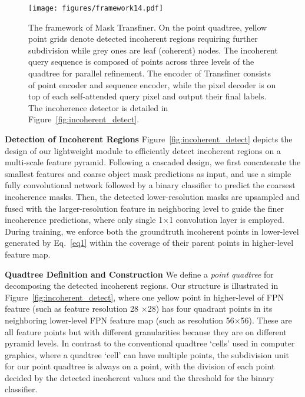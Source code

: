 \documentclass[10pt,twocolumn,letterpaper]{article}
\newcommand{\parsection}[1]{\vspace{1mm}\noindent\textbf{#1}}
\begin{document}
\begin{figure*}[!t]
    \vspace{-0.2in}
	\centering
\texttt{[image: figures/framework14.pdf]}
\caption{The framework of Mask Transfiner. On the point quadtree, yellow point grids denote detected incoherent regions requiring further subdivision while grey ones are leaf (coherent) nodes. The incoherent query sequence is composed of points across three levels of the quadtree for parallel refinement. The encoder of Transfiner consists of point encoder and sequence encoder, while the pixel decoder is on top of each self-attended query pixel and output their final labels. The incoherence detector is detailed in Figure~\ref{fig:incoherent_detect}.}
    \label{fig:model}
    \vspace{-0.2in}
\end{figure*}

\parsection{Detection of Incoherent Regions}
Figure~\ref{fig:incoherent_detect} depicts the design of our lightweight module to efficiently detect incoherent regions on a multi-scale feature pyramid. Following a cascaded design, we first concatenate the smallest features and coarse object mask predictions as input, and use a simple fully convolutional network followed by a binary classifier to predict the coarsest incoherence masks. Then, the detected lower-resolution masks are upsampled and fused with the larger-resolution feature in neighboring level to guide the finer incoherence predictions, where only single 1$\times$1 convolution layer is employed. During training, we enforce both the groundtruth incoherent points in lower-level generated by Eq.~\ref{eq1} within the coverage of their parent points in higher-level feature map. 


\parsection{Quadtree Definition and Construction} We define a \emph{point quadtree} for decomposing the detected incoherent regions. Our structure is illustrated in Figure~\ref{fig:incoherent_detect}, where one yellow point in higher-level of FPN feature (such as feature resolution 28 $\times $28) has four quadrant points in its neighboring lower-level FPN feature map (such as resolution 56$\times$56). These are all feature points but with different granularities because they are on different pyramid levels. In contrast to the conventional quadtree `cells' used in computer graphics, where a quadtree `cell' can have multiple points, the subdivision unit for our point quadtree is always on a point, with the division of each point decided by the detected incoherent values and the threshold for the binary classifier.
\end{document}
